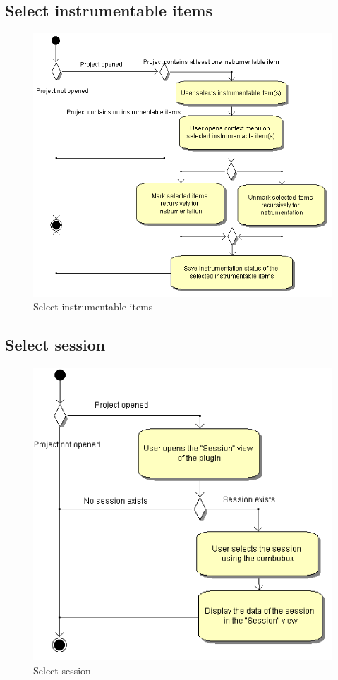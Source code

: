 \subsection{Select instrumentable items}
\begin{figure}[htb]
 \centering
 \includegraphics[height=0.7\textheight]{images/Activities/select_instrumentable_items.png}
 \caption{Select instrumentable items}
 \label{ac_fg:select_items}
\end{figure}

\clearpage
\subsection{Select session}
\begin{figure}[htb]
 \centering
 \includegraphics[height=0.7\textheight]{images/Activities/select_session.png}
 \caption{Select session}
 \label{ac_fg:select_session}
\end{figure}

